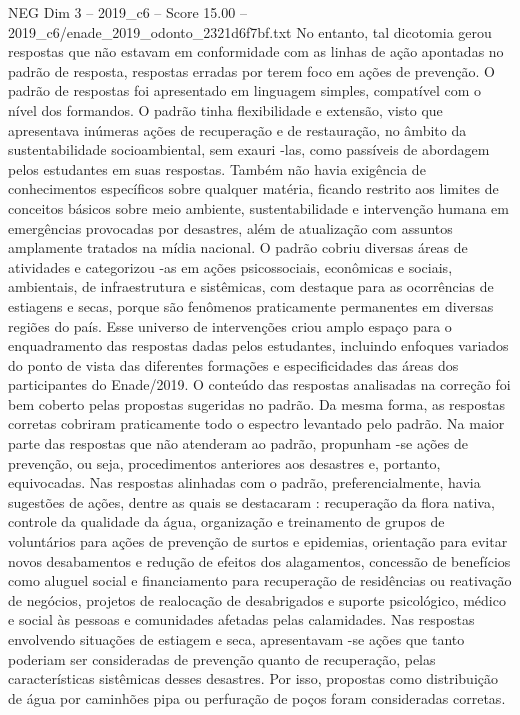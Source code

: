 \begin{textsample}{NEG Dim 3 – 2019\_c6 – Score 15.00 – 2019\_c6/enade\_2019\_odonto\_2321d6f7bf.txt}
No entanto, tal dicotomia gerou respostas que não estavam em conformidade com as linhas de ação apontadas no padrão de resposta, respostas erradas por terem foco em ações de prevenção.
O padrão de respostas foi apresentado em linguagem simples, compatível com o nível dos formandos.
O padrão tinha flexibilidade e extensão, visto que apresentava inúmeras ações de recuperação e de restauração, no âmbito da sustentabilidade socioambiental, sem exauri -las, como passíveis de abordagem pelos estudantes em suas respostas.
Também não havia exigência de conhecimentos específicos sobre qualquer matéria, ficando restrito aos limites de conceitos básicos sobre meio ambiente, sustentabilidade e intervenção humana em emergências provocadas por desastres, além de atualização com assuntos amplamente tratados na mídia nacional.
O padrão cobriu diversas áreas de atividades e categorizou -as em ações psicossociais, econômicas e sociais, ambientais, de infraestrutura e sistêmicas, com destaque para as ocorrências de estiagens e secas, porque são fenômenos praticamente permanentes em diversas regiões do país.
Esse universo de intervenções criou amplo espaço para o enquadramento das respostas dadas pelos estudantes, incluindo enfoques variados do ponto de vista das diferentes formações e especificidades das áreas dos participantes do Enade/2019.
O conteúdo das respostas analisadas na correção foi bem coberto pelas propostas sugeridas no padrão.
Da mesma forma, as respostas corretas cobriram praticamente todo o espectro levantado pelo padrão.
Na maior parte das respostas que não atenderam ao padrão, propunham -se ações de prevenção, ou seja, procedimentos anteriores aos desastres e, portanto, equivocadas.
Nas respostas alinhadas com o padrão, preferencialmente, havia sugestões de ações, dentre as quais se destacaram : recuperação da flora nativa, controle da qualidade da água, organização e treinamento de grupos de voluntários para ações de prevenção de surtos e epidemias, orientação para evitar novos desabamentos e redução de efeitos dos alagamentos, concessão de benefícios como aluguel social e financiamento para recuperação de residências ou reativação de negócios, projetos de realocação de desabrigados e suporte psicológico, médico e social às pessoas e comunidades afetadas pelas calamidades.
Nas respostas envolvendo situações de estiagem e seca, apresentavam -se ações que tanto poderiam ser consideradas de prevenção quanto de recuperação, pelas características sistêmicas desses desastres.
Por isso, propostas como distribuição de água por caminhões pipa ou perfuração de poços foram consideradas corretas.

\end{textsample}
